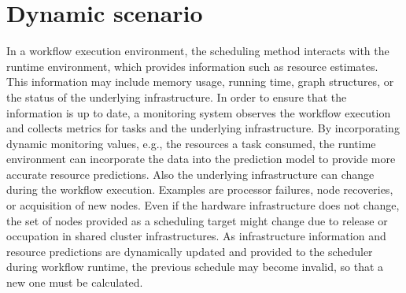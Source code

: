 \documentclass[conference]{IEEEtran}
\newcommand{\AB}[1]{\todo[inline]{{\color{purple}[AB: #1]}}}
\begin{document}
%
%
%
%
%
%



\section{Dynamic scenario}
\label{sec:dyn}
%
In a workflow execution environment, the scheduling method interacts with the runtime environment, which provides information such as resource estimates.
This information may include memory usage, running time, graph structures, or the status of the underlying infrastructure.
In order to ensure that the information is up to date, a monitoring system observes the workflow execution and collects metrics for tasks and the underlying infrastructure.
By incorporating dynamic monitoring values, e.g., the resources a task consumed, the runtime environment can incorporate the data into the prediction model to provide more accurate resource predictions.
Also the underlying infrastructure can change during the workflow execution.
Examples are processor failures, node recoveries, or acquisition of new nodes.
Even if the hardware infrastructure does not change, the set of nodes provided as a scheduling target might change due to release or occupation in shared cluster infrastructures.
As infrastructure information and resource predictions are dynamically updated and provided to the scheduler during workflow runtime, the previous schedule may become invalid, so that a new one must be calculated.
\end{document}
